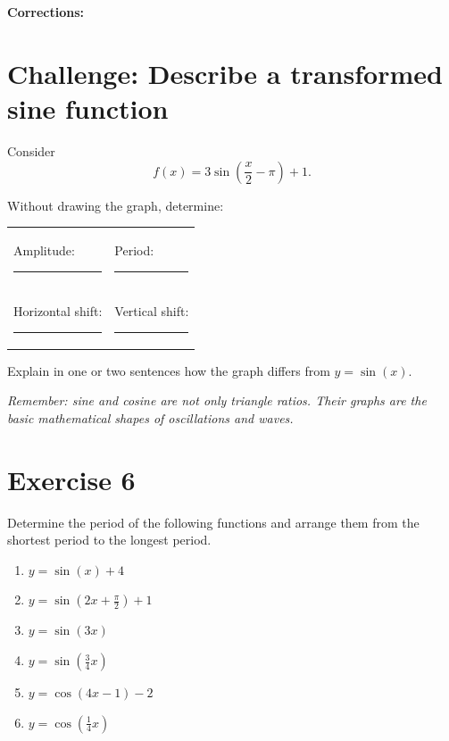 \documentclass[11pt,a4paper]{article}
\newcommand{\answerline}[1][4cm]{\rule{#1}{0.4pt}}
\begin{document}
\textbf{Corrections:}

\vspace{2cm}
\hrulefill

\newpage


\section*{Challenge: Describe a transformed sine function}

Consider
\[
f(x)=3\sin\left(\frac{x}{2}-\pi\right)+1.
\]

Without drawing the graph, determine:

\begin{tabular}{p{}p{}}
Amplitude: \answerline[5cm] &
Period: \answerline[5cm] \\[1.2cm]
Horizontal shift: \answerline[5cm] &
Vertical shift: \answerline[5cm]
\end{tabular}

Explain in one or two sentences how the graph differs from $y=\sin(x)$.

\vspace{2cm}
\hrulefill

\vspace{2cm}
\hrulefill

\vfill

\emph{Remember: sine and cosine are not only triangle ratios. Their graphs are
the basic mathematical shapes of oscillations and waves.}

\newpage


\section*{Exercise 6}
Determine the period of the following functions and arrange them from the
shortest period to the longest period.

\begin{enumerate}[label=\alph*)]
\item $y=\sin(x)+4$
\item $y=\sin\left(2x+\frac{\pi}{2}\right)+1$
\item $y=\sin(3x)$
\item $y=\sin\left(\frac34x\right)$
\item $y=\cos(4x-1)-2$
\item $y=\cos\left(\frac14x\right)$
\end{enumerate}
\end{document}
